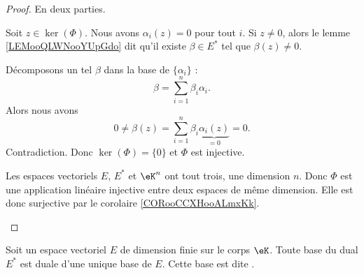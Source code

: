 \begin{proof}
	En deux parties.
	\begin{subproof}
		Soit \( z\in \ker(\Phi)\). Nous avons \( \alpha_i(z)=0\) pour tout \( i\). Si \( z\neq 0\), alors le lemme \ref{LEMooQLWNooYUpGdo} dit qu'il existe \( \beta\in E^*\) tel que \( \beta(z)\neq 0\).

		Décomposons un tel \( \beta\) dans la base de \( \{\alpha_i\}\) :
		\begin{equation}
			\beta=\sum_{i=1}^n\beta_i\alpha_i.
		\end{equation}
		Alors nous avons
		\begin{equation}
			0\neq \beta(z)=\sum_{i=1}^n\beta_i\underbrace{\alpha_i(z)}_{=0}=0.
		\end{equation}
		Contradiction. Donc \( \ker(\Phi)=\{ 0 \}\) et \( \Phi\) est injective.

		Les espaces vectoriels \( E\), \( E^*\) et \( \eK^n\) ont tout trois, une dimension \( n\). Donc \( \Phi\) est une application linéaire injective entre deux espaces de même dimension. Elle est donc surjective par le corolaire \ref{CORooCCXHooALmxKk}.
	\end{subproof}
\end{proof}


\begin{propositionDef}            \label{PROPooDBPGooPagbEB}
	Soit un espace vectoriel \( E\) de dimension finie sur le corps \( \eK\). Toute base du dual \( E^*\) est duale d'une unique base de \( E\). Cette base est dite .
\end{propositionDef}

